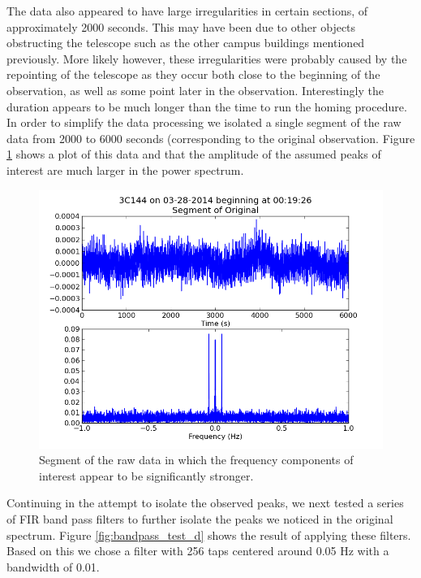 \documentclass{article}
\begin{document}
  The data also appeared to have large irregularities in certain sections, of
  approximately 2000 seconds. This may have been due to other objects
  obstructing the telescope such as the other campus buildings mentioned
  previously. More likely however, these irregularities were probably caused by
  the repointing of the telescope as they occur both close to the beginning of
  the observation, as well as some point later in the observation. Interestingly
  the duration appears to be much longer than the time to run the homing
  procedure.
    In order to simplify the data processing we isolated a single
  segment of the raw data from 2000 to 6000 seconds (corresponding to the
  original observation. Figure \ref{fig:seg} shows a plot of this data and that
  the amplitude of the assumed peaks of interest are much larger in the power
  spectrum.
    \begin{figure}[h!]
    \centering
    \includegraphics[scale=0.5]{img/crab/seg.png}
    \caption{Segment of the raw data in which the frequency components of
    interest appear to be significantly stronger.}
    \label{fig:seg}
    \end{figure}

  Continuing in the attempt to isolate the observed peaks, we next tested a
  series of FIR band pass filters to further isolate the peaks we noticed in the
  original spectrum. Figure \ref{fig:bandpass_test_d} shows the result of
  applying these filters. Based on this we chose a filter with 256 taps centered around 0.05 Hz
  with a bandwidth of 0.01.
\end{document}
